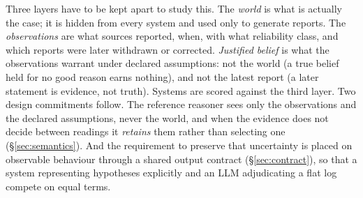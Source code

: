 Three layers have to be kept apart to study this. The \emph{world} is what is actually the case; it is hidden from every system and used only to generate reports. The \emph{observations} are what sources reported, when, with what reliability class, and which reports were later withdrawn or corrected. \emph{Justified belief} is what the observations warrant under declared assumptions: not the world (a true belief held for no good reason earns nothing), and not the latest report (a later statement is evidence, not truth). Systems are scored against the third layer. Two design commitments follow. The reference reasoner sees only the observations and the declared assumptions, never the world, and when the evidence does not decide between readings it \emph{retains} them rather than selecting one (\S\ref{sec:semantics}). And the requirement to preserve that uncertainty is placed on observable behaviour through a shared output contract (\S\ref{sec:contract}), so that a system representing hypotheses explicitly and an LLM adjudicating a flat log compete on equal terms.

